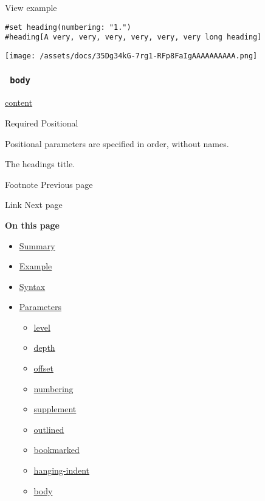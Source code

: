 
View example

\begin{verbatim}
#set heading(numbering: "1.")
#heading[A very, very, very, very, very, very long heading]
\end{verbatim}

\texttt{[image: /assets/docs/35Dg34kG-7rg1-RFp8FaIgAAAAAAAAAA.png]}

\subsubsection{\texorpdfstring{\texttt{\ body\ }}{ body }}\label{parameters-body}

\href{/docs/reference/foundations/content/}{content}

{Required} {{ Positional }}

\label{parameters-body-positional-tooltip}
Positional parameters are specified in order, without names.

The heading\textquotesingle s title.

\href{/docs/reference/model/footnote/}{\pandocbounded{}}

{ Footnote } { Previous page }

\href{/docs/reference/model/link/}{\pandocbounded{}}

{ Link } { Next page }

\textbf{On this page}

\begin{itemize}
\tightlist
\item
  \hyperref[summary]{Summary}
\item
  \hyperref[example]{Example}
\item
  \hyperref[syntax]{Syntax}
\item
  \hyperref[parameters]{Parameters}

  \begin{itemize}
  \tightlist
  \item
    \hyperref[parameters-level]{level}
  \item
    \hyperref[parameters-depth]{depth}
  \item
    \hyperref[parameters-offset]{offset}
  \item
    \hyperref[parameters-numbering]{numbering}
  \item
    \hyperref[parameters-supplement]{supplement}
  \item
    \hyperref[parameters-outlined]{outlined}
  \item
    \hyperref[parameters-bookmarked]{bookmarked}
  \item
    \hyperref[parameters-hanging-indent]{hanging-indent}
  \item
    \hyperref[parameters-body]{body}
  \end{itemize}
\end{itemize}

